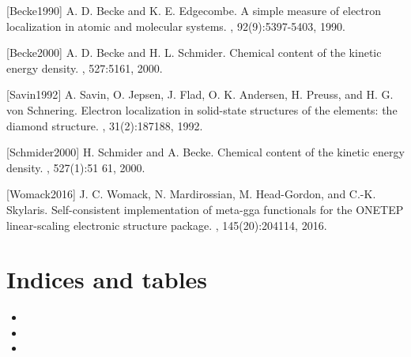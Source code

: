 \documentclass[letterpaper,10pt,english]{sphinxmanual}
\begin{document}
{[}Becke1990{]} A. D. Becke and K. E. Edgecombe. A simple measure of electron localization in atomic and molecular systems. , 92(9):5397-5403, 1990.

{[}Becke2000{]} A. D. Becke and H. L. Schmider. Chemical content of the kinetic energy density. , 527:51\textendash{}61, 2000.

{[}Savin1992{]} A. Savin, O. Jepsen, J. Flad, O. K. Andersen, H. Preuss, and H. G. von Schnering. Electron localization in solid-state structures of the elements: the diamond structure. , 31(2):187\textendash{}188, 1992.

{[}Schmider2000{]} H. Schmider and A. Becke. Chemical content of the kinetic energy density. , 527(1):51 \textendash{} 61, 2000.

{[}Womack2016{]} J. C. Womack, N. Mardirossian, M. Head-Gordon, and C.-K. Skylaris. Self-consistent implementation of meta-gga functionals for the ONETEP linear-scaling electronic structure package. , 145(20):204114, 2016.


\chapter{Indices and tables}
\label{\detokenize{index:indices-and-tables}}\begin{itemize}
\item {} 

\item {} 

\item {} 

\end{itemize}



\renewcommand{\indexname}{Index}
\printindex
\end{document}
